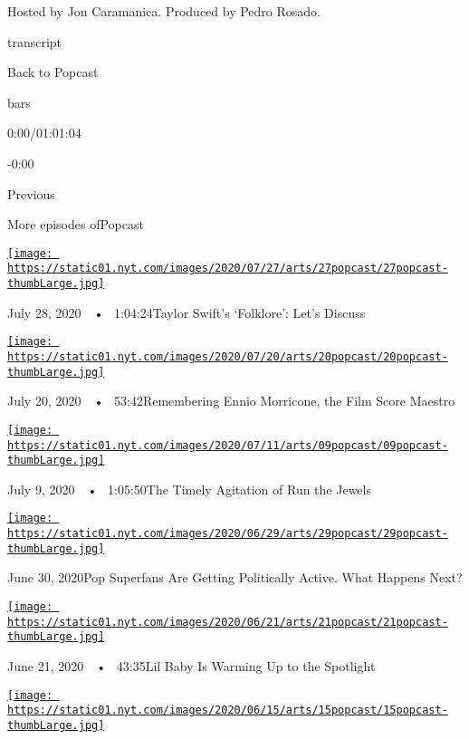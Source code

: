 Hosted by Jon Caramanica. Produced by Pedro Rosado.

transcript

Back to Popcast

bars

0:00/01:01:04

-0:00

Previous

More episodes ofPopcast

\href{https://www.nytimes.com/2020/07/27/arts/music/popcast-taylor-swift-folklore.html?action=click\&module=audio-series-bar\&region=header\&pgtype=Article}{\texttt{[image: https://static01.nyt.com/images/2020/07/27/arts/27popcast/27popcast-thumbLarge.jpg]}}

July 28, 2020~~•~ 1:04:24Taylor Swift's `Folklore': Let's Discuss

\href{https://www.nytimes.com/2020/07/20/arts/music/popcast-ennio-morricone.html?action=click\&module=audio-series-bar\&region=header\&pgtype=Article}{\texttt{[image: https://static01.nyt.com/images/2020/07/20/arts/20popcast/20popcast-thumbLarge.jpg]}}

July 20, 2020~~•~ 53:42Remembering Ennio Morricone, the Film Score
Maestro

\href{https://www.nytimes.com/2020/07/09/arts/music/popcast-run-the-jewels.html?action=click\&module=audio-series-bar\&region=header\&pgtype=Article}{\texttt{[image: https://static01.nyt.com/images/2020/07/11/arts/09popcast/09popcast-thumbLarge.jpg]}}

July 9, 2020~~•~ 1:05:50The Timely Agitation of Run the Jewels

\href{https://www.nytimes.com/2020/06/30/arts/music/popcast-superfans-politics.html?action=click\&module=audio-series-bar\&region=header\&pgtype=Article}{\texttt{[image: https://static01.nyt.com/images/2020/06/29/arts/29popcast/29popcast-thumbLarge.jpg]}}

June 30, 2020Pop Superfans Are Getting Politically Active. What Happens
Next?

\href{https://www.nytimes.com/2020/06/21/arts/music/popcast-lil-baby.html?action=click\&module=audio-series-bar\&region=header\&pgtype=Article}{\texttt{[image: https://static01.nyt.com/images/2020/06/21/arts/21popcast/21popcast-thumbLarge.jpg]}}

June 21, 2020~~•~ 43:35Lil Baby Is Warming Up to the Spotlight

\href{https://www.nytimes.com/2020/06/15/arts/music/popcast-urban-music.html?action=click\&module=audio-series-bar\&region=header\&pgtype=Article}{\texttt{[image: https://static01.nyt.com/images/2020/06/15/arts/15popcast/15popcast-thumbLarge.jpg]}}


